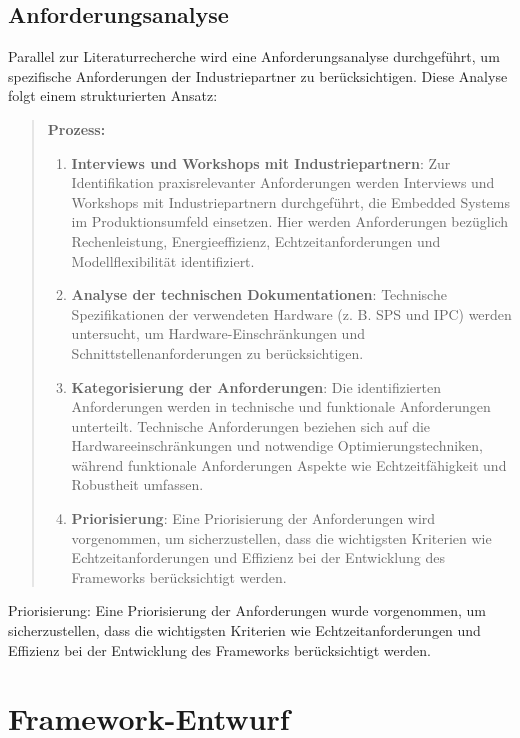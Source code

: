 \subsection{Anforderungsanalyse}

Parallel zur Literaturrecherche wird eine Anforderungsanalyse durchgeführt, um spezifische Anforderungen der Industriepartner zu berücksichtigen. Diese Analyse folgt einem strukturierten Ansatz:
\begin{quote}
\textbf{Prozess:}
\begin{enumerate}
\item \textbf{Interviews und Workshops mit Industriepartnern}: Zur Identifikation praxisrelevanter Anforderungen werden Interviews und Workshops mit Industriepartnern durchgeführt, die Embedded Systems im Produktionsumfeld einsetzen. Hier werden Anforderungen bezüglich Rechenleistung, Energieeffizienz, Echtzeitanforderungen und Modellflexibilität identifiziert.
\item \textbf{Analyse der technischen Dokumentationen}: Technische Spezifikationen der verwendeten Hardware (z. B. SPS und IPC) werden untersucht, um Hardware-Einschränkungen und Schnittstellenanforderungen zu berücksichtigen.
\item \textbf{Kategorisierung der Anforderungen}: Die identifizierten Anforderungen werden in technische und funktionale Anforderungen unterteilt. Technische Anforderungen beziehen sich auf die Hardwareeinschränkungen und notwendige Optimierungstechniken, während funktionale Anforderungen Aspekte wie Echtzeitfähigkeit und Robustheit umfassen.
\item \textbf{Priorisierung}: Eine Priorisierung der Anforderungen wird vorgenommen, um sicherzustellen, dass die wichtigsten Kriterien wie Echtzeitanforderungen und Effizienz bei der Entwicklung des Frameworks berücksichtigt werden.
\end{enumerate}
\end{quote}
Priorisierung: Eine Priorisierung der Anforderungen wurde vorgenommen, um sicherzustellen, dass die wichtigsten Kriterien wie Echtzeitanforderungen und Effizienz bei der Entwicklung des Frameworks berücksichtigt werden.

\section{Framework-Entwurf}

